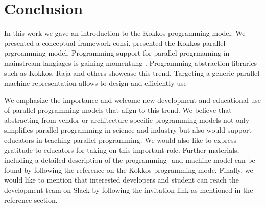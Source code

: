 \section{Conclusion}\label{chap:conclusion}
In this work we gave an introduction to the Kokkos programming model. We presented a conceptual framework consi,  presented the Kokkos parallel prgroamming model. 
Programming support for parallel progrmaming in mainstream langiages is gaining momentung
. Programming abstraction libraries such as Kokkos, Raja and others showcase this trend. Targeting a generic parallel machine representation allows to design and efficiently use 

We emphasize the importance and welcome new development and educational use of parallel programming models that align to this trend. We believe that abstracting from vendor or architecture-specific programming models not only simplifies parallel programming in science and industry but also would support educators in teaching parallel programming.
We would also like to express gratitude to educators for taking on this important role. Further materials, including a detailed description of the programming- and machine model can be found by following the reference on the Kokkos programming mode. Finally, we would like to mention that interested developers and student can reach the development team on Slack by following the invitation link as mentioned in the reference section.
